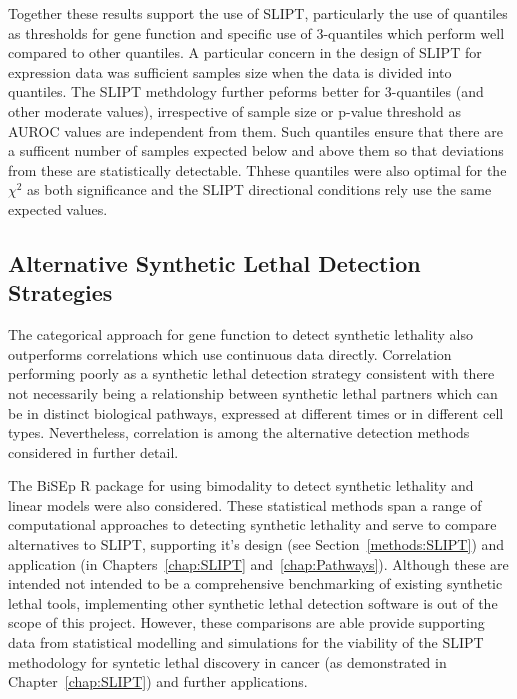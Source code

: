 Together these results support the use of \gls{SLIPT}, particularly the use of quantiles as thresholds for gene function and specific use of 3-quantiles which perform well compared to other quantiles. A particular concern in the design of \gls{SLIPT} for expression data was sufficient samples size when the data is divided into quantiles. The \gls{SLIPT} methdology further peforms better for 3-quantiles (and other moderate values), irrespective of sample size or p-value threshold as \gls{AUROC} values are independent from them. Such quantiles ensure that there are a sufficent number of samples expected below and above them so that deviations from these are statistically detectable. Thhese quantiles were also optimal for the $\chi^2$ as both significance and the \gls{SLIPT} directional conditions rely use the same expected values.

\FloatBarrier

\subsection{Alternative Synthetic Lethal Detection Strategies}

The categorical approach for gene function to detect synthetic lethality also outperforms correlations which use continuous data directly. Correlation performing poorly as a synthetic lethal detection strategy consistent with there not necessarily being a relationship between synthetic lethal partners which can be in distinct biological pathways, expressed at different times or in different cell types. Nevertheless, correlation is among the alternative detection methods considered in further detail.

The \gls{BiSEp} R package \citep{Wappett2014} for using bimodality to detect synthetic lethality \citep{Wappett2016} and linear models were also considered. These statistical methods span a range of computational approaches to detecting synthetic lethality and serve to compare alternatives to \gls{SLIPT}, supporting it's design (see Section~\ref{methods:SLIPT}) and application (in Chapters~\ref{chap:SLIPT} and~\ref{chap:Pathways}). Although these are intended not intended to be a comprehensive benchmarking of existing synthetic lethal tools, implementing other synthetic lethal detection software is out of the scope of this project. However, these comparisons are able provide supporting data from statistical modelling and simulations for the viability of the \gls{SLIPT} methodology for syntetic lethal discovery in cancer (as demonstrated in Chapter~\ref{chap:SLIPT}) and further applications.

